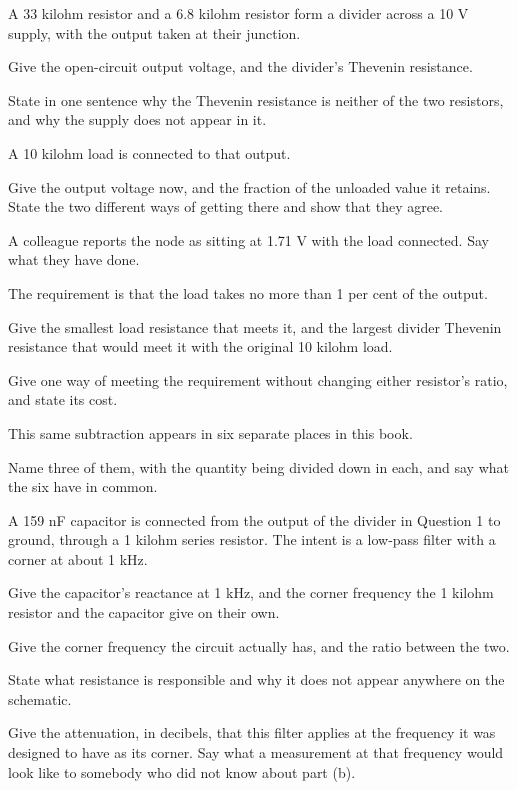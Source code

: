 A 33 kilohm resistor and a 6.8 kilohm resistor form a divider across a 10 V supply, with the output taken at their junction.

 Give the open-circuit output voltage, and the divider's Thevenin resistance.

State in one sentence why the Thevenin resistance is neither of the two resistors, and why the supply does not appear in it.

 A 10 kilohm load is connected to that output.

Give the output voltage now, and the fraction of the unloaded value it retains. State the two different ways of getting there and show that they agree.

A colleague reports the node as sitting at 1.71 V with the load connected. Say what they have done.

 The requirement is that the load takes no more than 1 per cent of the output.

Give the smallest load resistance that meets it, and the largest divider Thevenin resistance that would meet it with the original 10 kilohm load.

Give one way of meeting the requirement without changing either resistor's ratio, and state its cost.

 This same subtraction appears in six separate places in this book.

Name three of them, with the quantity being divided down in each, and say what the six have in common.

\label{exa:q:2}

A 159 nF capacitor is connected from the output of the divider in Question 1 to ground, through a 1 kilohm series resistor. The intent is a low-pass filter with a corner at about 1 kHz.

 Give the capacitor's reactance at 1 kHz, and the corner frequency the 1 kilohm resistor and the capacitor give on their own.

 Give the corner frequency the circuit actually has, and the ratio between the two.

State what resistance is responsible and why it does not appear anywhere on the schematic.

 Give the attenuation, in decibels, that this filter applies at the frequency it was designed to have as its corner. Say what a measurement at that frequency would look like to somebody who did not know about part (b).

